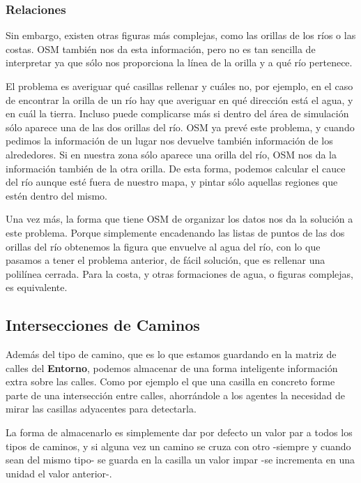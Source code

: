 \subsubsection*{Relaciones}

Sin embargo, existen otras figuras más complejas, como las orillas de los ríos
o las costas. OSM también nos da esta información, pero no es tan sencilla de
interpretar ya que sólo nos proporciona la línea de la orilla y a qué río
pertenece.

El problema es averiguar qué casillas rellenar y cuáles no, por ejemplo, en el
caso de encontrar la orilla de un río hay que averiguar en qué dirección está
el agua, y en cuál la tierra. Incluso puede complicarse más si dentro del área
de simulación sólo aparece una de las dos orillas del río. OSM ya prevé este
problema, y cuando pedimos la información de un lugar nos devuelve también
información de los alrededores. Si en nuestra zona sólo aparece una orilla del
río, OSM nos da la información también de la otra orilla. De esta forma, podemos
calcular el cauce del río aunque esté fuera de nuestro mapa, y pintar sólo
aquellas regiones que estén dentro del mismo.

Una vez más, la forma que tiene OSM de organizar los datos nos da la solución
a este problema. Porque simplemente encadenando las listas de puntos de las dos
orillas del río obtenemos la figura que envuelve al agua del río, con lo que
pasamos a tener el problema anterior, de fácil solución, que es rellenar una
polilínea cerrada. Para la costa, y otras formaciones de agua, o figuras
complejas, es equivalente.

\subsection*{Intersecciones de Caminos}

Además del tipo de camino, que es lo que estamos guardando en la matriz de
calles del {\bf Entorno}, podemos almacenar de una forma inteligente información
extra sobre las calles. Como por ejemplo el que una casilla en concreto forme
parte de una intersección entre calles, ahorrándole a los agentes la necesidad
de mirar las casillas adyacentes para detectarla.

La forma de almacenarlo es simplemente dar por defecto un valor par a todos los
tipos de caminos, y si alguna vez un camino se cruza con otro -siempre y cuando
sean del mismo tipo- se guarda en la casilla un valor impar -se incrementa en
una unidad el valor anterior-.

